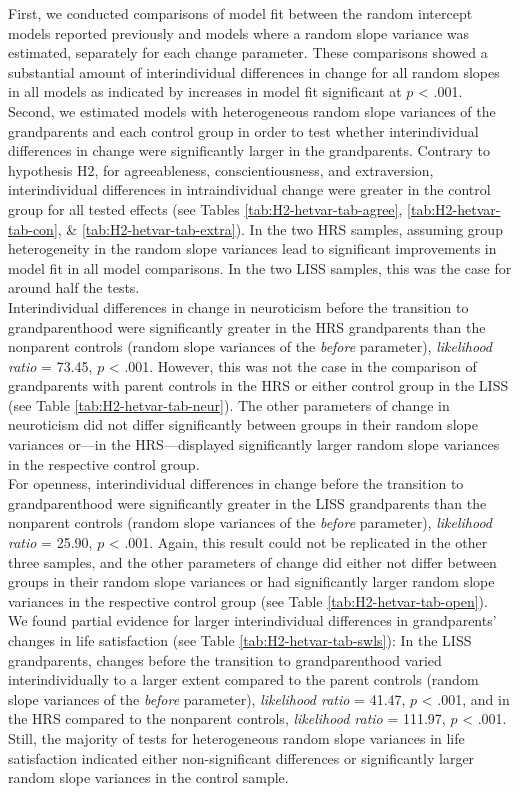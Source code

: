 \documentclass[
  english,
  man, noextraspace]{apa7}
\begin{document}
First, we conducted comparisons of model fit between the random intercept models reported previously and models where a random slope variance was estimated, separately for each change parameter. These comparisons showed a substantial amount of interindividual differences in change for all random slopes in all models as indicated by increases in model fit significant at \(p\) \textless{} .001.\\
Second, we estimated models with heterogeneous random slope variances of the grandparents and each control group in order to test whether interindividual differences in change were significantly larger in the grandparents. Contrary to hypothesis H2, for agreeableness, conscientiousness, and extraversion, interindividual differences in intraindividual change were greater in the control group for all tested effects (see Tables \ref{tab:H2-hetvar-tab-agree}, \ref{tab:H2-hetvar-tab-con}, \& \ref{tab:H2-hetvar-tab-extra}). In the two HRS samples, assuming group heterogeneity in the random slope variances lead to significant improvements in model fit in all model comparisons. In the two LISS samples, this was the case for around half the tests.\\
Interindividual differences in change in neuroticism before the transition to grandparenthood were significantly greater in the HRS grandparents than the nonparent controls (random slope variances of the \emph{before} parameter), \emph{likelihood ratio} = 73.45, \(p\) \textless{} .001. However, this was not the case in the comparison of grandparents with parent controls in the HRS or either control group in the LISS (see Table \ref{tab:H2-hetvar-tab-neur}). The other parameters of change in neuroticism did not differ significantly between groups in their random slope variances or---in the HRS---displayed significantly larger random slope variances in the respective control group.\\
For openness, interindividual differences in change before the transition to grandparenthood were significantly greater in the LISS grandparents than the nonparent controls (random slope variances of the \emph{before} parameter), \emph{likelihood ratio} = 25.90, \(p\) \textless{} .001. Again, this result could not be replicated in the other three samples, and the other parameters of change did either not differ between groups in their random slope variances or had significantly larger random slope variances in the respective control group (see Table \ref{tab:H2-hetvar-tab-open}).\\
We found partial evidence for larger interindividual differences in grandparents' changes in life satisfaction (see Table \ref{tab:H2-hetvar-tab-swls}): In the LISS grandparents, changes before the transition to grandparenthood varied interindividually to a larger extent compared to the parent controls (random slope variances of the \emph{before} parameter), \emph{likelihood ratio} = 41.47, \(p\) \textless{} .001, and in the HRS compared to the nonparent controls, \emph{likelihood ratio} = 111.97, \(p\) \textless{} .001. Still, the majority of tests for heterogeneous random slope variances in life satisfaction indicated either non-significant differences or significantly larger random slope variances in the control sample.
\end{document}

